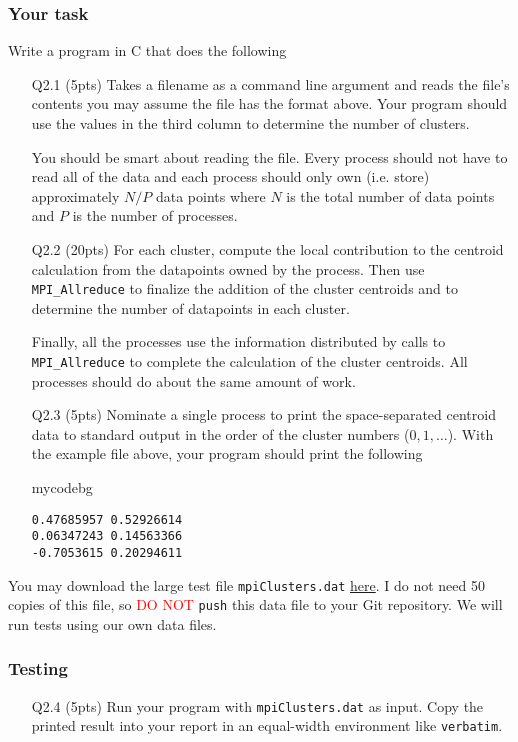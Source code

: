 \subsubsection*{Your task}
Write a program in C that does the following
\begin{itemize}
    \item[Q2.1] (5pts) Takes a filename as a command line argument and reads the file's contents you may assume the file has the format above.
    Your program should use the values in the third column to determine the number of clusters.
    
    You should be smart about reading the file. Every process should not have to read all of the data and each process should only own (i.e. store) approximately $N/P$ data points where $N$ is the total number of data points and $P$ is the number of processes.
    
    \item[Q2.2] (20pts) For each cluster, compute the local contribution to the centroid calculation from the datapoints owned by the process.
    Then use \texttt{MPI\_Allreduce} to finalize the addition of the cluster centroids and to determine the number of datapoints in each cluster.
    
    Finally, all the processes use the information distributed by calls to \texttt{MPI\_Allreduce} to complete the calculation of the cluster centroids.
    All processes should do about the same amount of work.
    
    \item[Q2.3] (5pts) Nominate a single process to print the space-separated centroid data to standard output in the order of the cluster numbers ($0,1,\dots$).
    With the example file above, your program should print the following
    \begin{tsession}{mycodebg}
    \begin{verbatim}
0.47685957 0.52926614
0.06347243 0.14563366
-0.7053615 0.20294611\end{verbatim}
    \end{tsession}
\end{itemize}
You may download the large test file \texttt{mpiClusters.dat} \href{https://canvas.vt.edu/files/11482183/download?download_frd=1}{here}.
I do not need 50 copies of this file, so \textcolor{red}{DO NOT} \texttt{push} this data file to your Git repository.
We will run tests using our own data files.
\subsubsection*{Testing}
\begin{itemize}
    \item[Q2.4] (5pts) Run your program with \texttt{mpiClusters.dat} as input.
    Copy the printed result into your report in an equal-width environment like \texttt{verbatim}.
\end{itemize}

